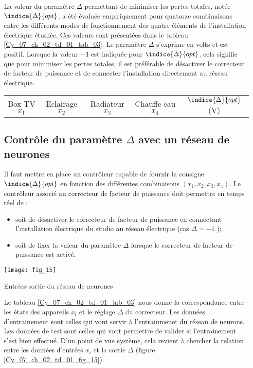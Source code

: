 La valeur du paramètre $\Delta$ permettant de minimiser les pertes totales, notée $\indice{\Delta}{opt}$, a été évaluée empiriquement pour quatorze combinaisons entre les différents modes de fonctionnement
des quatre éléments de l’installation électrique étudiée. Ces valeurs sont présentées dans le
tableau \ref{Cy_07_ch_02_td_01_tab_03}. Le paramètre $\Delta$ s’exprime en volts et est positif. Lorsque la valeur $-1$ est indiquée
pour $\indice{\Delta}{opt}$, cela signifie que pour minimiser les pertes totales, il est préférable de désactiver
le correcteur de facteur de puissance et de connecter l’installation directement au réseau
électrique.

\begin{table}[!h]
\centering
\begin{tabular}{ccccc}
Box-TV $x_1$ & Eclairage $x_2$ & Radiateur $x_3$ & Chauffe-eau $x_4$ & $\indice{\Delta}{opt}$ (V)
\end{tabular}
\end{table}



\subsection*{Contrôle du paramètre $\Delta$ avec un réseau de neurones}
Il faut mettre en place un contrôleur capable de fournir la consigne $\indice{\Delta}{opt}$ en fonction des différentes combinaisons $\left(x_1, x_2, x_3, x_4 \right)$. Le contrôleur associé au correcteur de facteur de puissance doit permettre en temps réel de : 
\begin{itemize}
\item soit de désactiver le correcteur de facteur de puissance en connectant l'installation électrique du studio au réseau électrique (cas $\Delta = -1$ );
\item soit de fixer la valeur du paramètre $\Delta$ lorsque le correcteur de facteur de puissance est activé.
\end{itemize}

\begin{marginfigure}
\centering
\texttt{[image: fig\_15]}
\caption{Entrées-sortie du réseau de neurones\label{Cy_07_ch_02_td_01_fig_15}}
\end{marginfigure}

Le tableau \ref{Cy_07_ch_02_td_01_tab_03} nous donne la correspondance entre les états des appareils $x_i$ et le réglage $\Delta$ du correcteur. Les données d'entrainement sont celles qui vont servir à l'entrainmenet du réseau de neurons. Les données de test sont celles qui vont permettre de valider si l'entrainement s'est bien effectué. D'un point de vue système, cela revient à chercher la relation entre les données d'entrées $x_i$ et la sortie $\Delta$ (figure \ref{Cy_07_ch_02_td_01_fig_15}). 


